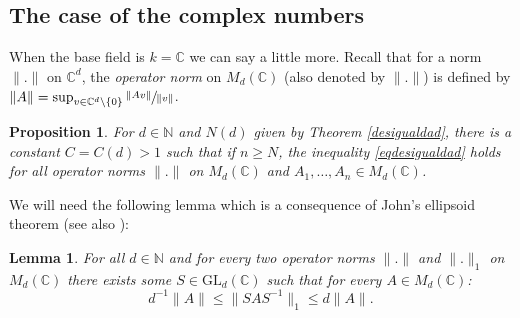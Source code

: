 \documentclass[JEP,XML,SOM,Unicode,NoEqCountersInSection]{cedram}
\theoremstyle{plain}
\newtheorem{prop}[teo]{Proposition}
\newtheorem{lema}[teo]{Lemma}
\theoremstyle{definition}
\newcommand{\NN}{\mathbb{N}}
\newcommand{\CC}{\mathbb{C}}
\begin{document}
\subsection{The case of the complex numbers}\label{casoc} When the base field is $k=\CC$ we can say a little more. Recall that for a norm $\|.\|$ on $\CC^{d}$, the \textit{operator norm} on $M_{d}(\CC)$ (also denoted by $\|.\|$) is defined by $\|A\|=\sup_{v\in \CC^{d}\backslash \{ 0\}}{\sfrac{\|Av\|}{\|v\|}}$.
\begin{prop}\label{independ} For $d\in \NN$ and $N(d)$ given by Theorem \ref{desigualdad}, there is a constant $C=C(d)>1$ such that if $n\geq N$, the inequality \eqref{eqdesigualdad} holds for all operator norms $\|.\|$ on $M_{d}(\CC)$ and $A_1,\dots,A_n\in M_{d}(\CC)$.
\end{prop}
We will need the following lemma which is a consequence of John's ellipsoid theorem \cite[Th.\,10.12.2]{schr} (see also \cite[Lem.\,3.2]{bociineq}):
\begin{lema}\label{lemadeljairo}
For all $d\in \NN$ and for every two operator norms $\|.\|$ and $\|.\|_{1}$ on $M_{d}(\CC)$ there exists some $S\in\mathrm{GL}_{d}(\CC)$ such that for every $A \in M_{d}(\CC)$:
\begin{equation*}\label{kk}
d^{-1}\|A\|\leq\|SAS^{-1}\|_{1}\leq d\|A\|.
\end{equation*}
\end{lema}
\end{document}
